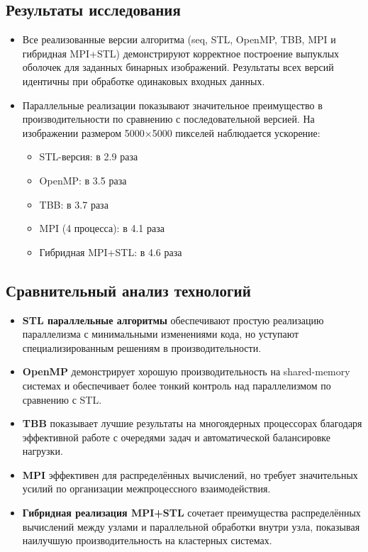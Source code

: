\documentclass[12pt]{article}
\begin{document}
\subsection{Результаты исследования}
\begin{itemize}
    \item Все реализованные версии алгоритма (seq, STL, OpenMP, TBB, MPI и гибридная MPI+STL) демонстрируют корректное построение выпуклых оболочек для заданных бинарных изображений. Результаты всех версий идентичны при обработке одинаковых входных данных.
    
    \item Параллельные реализации показывают значительное преимущество в производительности по сравнению с последовательной версией. На изображении размером 5000×5000 пикселей наблюдается ускорение:
    \begin{itemize}
        \item STL-версия: в 2.9 раза
        \item OpenMP: в 3.5 раза
        \item TBB: в 3.7 раза
        \item MPI (4 процесса): в 4.1 раза
        \item Гибридная MPI+STL: в 4.6 раза
    \end{itemize}
\end{itemize}

\subsection{Сравнительный анализ технологий}
\begin{itemize}
    \item \textbf{STL параллельные алгоритмы} обеспечивают простую реализацию параллелизма с минимальными изменениями кода, но уступают специализированным решениям в производительности.
    
    \item \textbf{OpenMP} демонстрирует хорошую производительность на shared-memory системах и обеспечивает более тонкий контроль над параллелизмом по сравнению с STL.
    
    \item \textbf{TBB} показывает лучшие результаты на многоядерных процессорах благодаря эффективной работе с очередями задач и автоматической балансировке нагрузки.
    
    \item \textbf{MPI} эффективен для распределённых вычислений, но требует значительных усилий по организации межпроцессного взаимодействия.
    
    \item \textbf{Гибридная реализация MPI+STL} сочетает преимущества распределённых вычислений между узлами и параллельной обработки внутри узла, показывая наилучшую производительность на кластерных системах.
\end{itemize}
\end{document}
